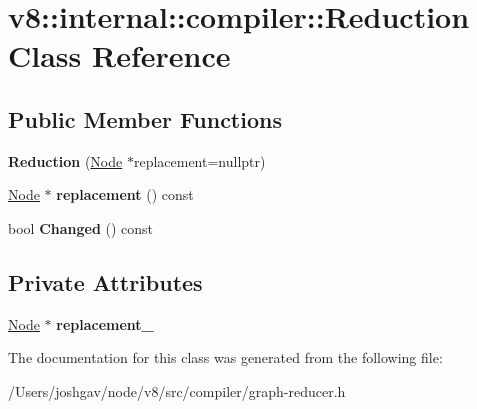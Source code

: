 \hypertarget{classv8_1_1internal_1_1compiler_1_1_reduction}{}\section{v8\+:\+:internal\+:\+:compiler\+:\+:Reduction Class Reference}
\label{classv8_1_1internal_1_1compiler_1_1_reduction}
\subsection*{Public Member Functions}
\begin{DoxyCompactItemize}
\item 
{\bfseries Reduction} (\hyperlink{classv8_1_1internal_1_1compiler_1_1_node}{Node} $\ast$replacement=nullptr)\hypertarget{classv8_1_1internal_1_1compiler_1_1_reduction_a2ba0febe91e73cc23dbb3fe92aac3d9e}{}\label{classv8_1_1internal_1_1compiler_1_1_reduction_a2ba0febe91e73cc23dbb3fe92aac3d9e}

\item 
\hyperlink{classv8_1_1internal_1_1compiler_1_1_node}{Node} $\ast$ {\bfseries replacement} () const \hypertarget{classv8_1_1internal_1_1compiler_1_1_reduction_ab924c6e677006692e07e51ff02b3ed80}{}\label{classv8_1_1internal_1_1compiler_1_1_reduction_ab924c6e677006692e07e51ff02b3ed80}

\item 
bool {\bfseries Changed} () const \hypertarget{classv8_1_1internal_1_1compiler_1_1_reduction_ae5b7594b1e94c0b9e3d736a5a4b2121a}{}\label{classv8_1_1internal_1_1compiler_1_1_reduction_ae5b7594b1e94c0b9e3d736a5a4b2121a}

\end{DoxyCompactItemize}
\subsection*{Private Attributes}
\begin{DoxyCompactItemize}
\item 
\hyperlink{classv8_1_1internal_1_1compiler_1_1_node}{Node} $\ast$ {\bfseries replacement\+\_\+}\hypertarget{classv8_1_1internal_1_1compiler_1_1_reduction_aa1671a398e2d86f1b48d96fa53e7ba0d}{}\label{classv8_1_1internal_1_1compiler_1_1_reduction_aa1671a398e2d86f1b48d96fa53e7ba0d}

\end{DoxyCompactItemize}


The documentation for this class was generated from the following file\+:\begin{DoxyCompactItemize}
\item 
/\+Users/joshgav/node/v8/src/compiler/graph-\/reducer.\+h\end{DoxyCompactItemize}
